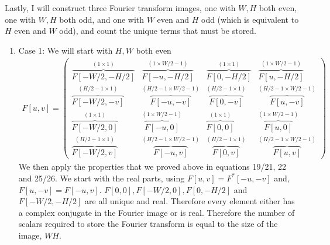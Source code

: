\documentclass{article}
\begin{document}
Lastly, I will construct three Fourier transform images, one with $W,H$ both even, one with $W,H$ both odd, and one with $W$ even and $H$ odd (which is equivalent to $H$ even and $W$ odd), and count the unique terms that must be stored. \\
\begin{enumerate}
	\item Case 1: We will start with $H,W$ both even \\	
\begin{align}
	F[u,v] = \left(\begin{array}{c|c|c|c}
		\overbrace{F[-W/2,-H/2]}^{(1\times1)} & \overbrace{F[-u,-H/2]}^{(1 \times W/2-1)} & \overbrace{F[0,-H/2]}^{(1\times1)} & \overbrace{F[u,-H/2]}^{(1 \times W/2-1)} \\ \hline
		\overbrace{F[-W/2,-v]}^{(H/2-1\times1)} & \overbrace{F[-u,-v]}^{(H/2-1 \times W/2-1)} & \overbrace{F[0,-v]}^{(H/2-1\times1)} & \overbrace{F[u,-v]}^{(H/2-1 \times W/2-1)}\\ \hline
		\overbrace{F[-W/2,0]}^{(1\times1)} & \overbrace{F[-u,0]}^{(1 \times W/2-1)} & \overbrace{F[0,0]}^{(1\times1)} & \overbrace{F[u,0]}^{(1 \times W/2-1)}\\ \hline
		\overbrace{F[-W/2,v]}^{(H/2-1\times1)} & \overbrace{F[-u,v]}^{(H/2-1 \times W/2-1)} & \overbrace{F[0,v]}^{(H/2-1\times1)} & \overbrace{F[u,v]}^{(H/2-1 \times W/2-1)}
	\end{array} \right)
\end{align}
We then apply the properties that we proved above in equations 19/21, 22 and 25/26. We start with the real parts, using $F[u,v] = F^*[-u,-v]$ and, $F[u,-v] = F[-u,v]$. $F[0,0], F[-W/2,0], F[0,-H/2]$ and $F[-W/2,-H/2]$ are all unique and real. Therefore every element either has a complex conjugate in the Fourier image or is real. Therefore the number of scalars required to store the Fourier transform is equal to the size of the image, $WH$.


\end{enumerate}
\end{document}
